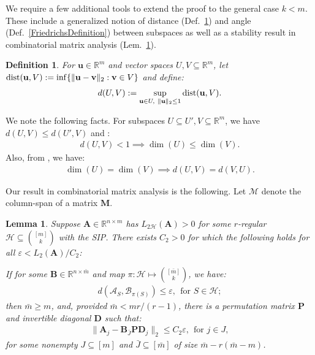 \documentclass[9pt,twocolumn]{pnas-new}
\newtheorem{lemma}{Lemma}
\newtheorem{definition}{Definition}
\begin{document}
We require a few additional tools to extend the proof to the general case $k < m$. These include a generalized notion of distance (Def.~\ref{dDef}) and angle (Def.~\ref{FriedrichsDefinition}) between subspaces as well as a stability result in combinatorial matrix analysis (Lem.~\ref{MainLemma}).

\begin{definition}\label{dDef}
For $\mathbf{u} \in \mathbb R^m$ and vector spaces $U,V \subseteq \mathbb{R}^m$, let $\text{\rm dist}(\mathbf{u}, V) := \inf \{\| \mathbf{u}-\mathbf{v} \|_2: \mathbf{v} \in V\}$ and define:
\begin{align}
d(U,V) := \sup_{\mathbf{u} \in U, \ \|\mathbf{u}\|_2 \leq 1} \text{\rm dist}(\mathbf{u},V).
\end{align}
\end{definition}

We note the following facts. For subspaces $U \subseteq U', V \subseteq \mathbb{R}^m$, we have $d(U,V) \leq d(U',V)$ and \cite[Ch.~4 Cor.~2.6]{Kato2013}: %
\begin{align}\label{dimLem}
d(U,V) < 1 \implies \dim(U) \leq \dim(V).
\end{align}
Also, from \cite[Lem.~3.2]{Morris10}, we have:
\begin{align}\label{eqdim}
\dim(U) = \dim(V) \implies d(U,V) = d(V,U).
\end{align}

Our result in combinatorial matrix analysis is the following. Let $\bm{\mathcal{M}}$ denote the column-span of a matrix $\mathbf{M}$.

\begin{lemma}\label{MainLemma}
Suppose $\mathbf{A} \in \mathbb{R}^{n \times m}$ has $L_{2\mathcal{H}}(\mathbf{A}) > 0$ for some $r$-regular $\mathcal{H} \subseteq {[m] \choose k}$ with the SIP. There exists $C_2 > 0$ for which the following holds for all $\varepsilon < L_2(\mathbf{A}) / C_2$:

If for some  $\mathbf{B} \in \mathbb{R}^{n \times \bar m}$ and map $\pi: \mathcal{H} \mapsto {[\bar m] \choose k}$, we have:
\begin{align}\label{GapUpperBound}
d(\bm{\mathcal{A}}_S, \bm{\mathcal{B}}_{\pi(S)}) \leq \varepsilon, \ \  \text{for $S \in \mathcal{H}$};
\end{align}
then $\bar m \geq m$, and, provided $\bar m < mr /(r-1)$, there is a permutation matrix $\mathbf{P}$ and invertible diagonal $\mathbf{D}$ such that:
\begin{align}\label{MainLemmaBPD}
\|\mathbf{A}_j - \mathbf{B}_{\bar J} \mathbf{PD}_j\|_2 \leq C_2 \varepsilon, \ \  \text{for } j \in J,
\end{align}
for some nonempty $J \subseteq [m]$ and $\bar J \subseteq[\bar{m}]$ of size $\bar m - r(\bar m - m)$.
\end{lemma}
\end{document}
